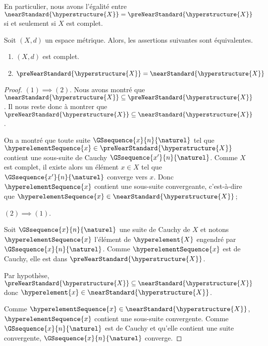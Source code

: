 En particulier, nous avons l'égalité
entre $\nearStandard{\hyperstructure{X}} =
\preNearStandard{\hyperstructure{X}}$ si et seulement si $X$ est complet.

\begin{proposition}
	Soit $(X, d)$ un espace métrique. Alors, les assertions suivantes sont
	équivalentes.

	\begin{enumerate}
		\item $(X, d)$ est complet.
		\item $\preNearStandard{\hyperstructure{X}} =
			\nearStandard{\hyperstructure{X}}$
	\end{enumerate}
\end{proposition}

\ifdefined\outputproof
\begin{proof}
	$(1) \implies (2)$. Nous avons montré que $\nearStandard{\hyperstructure{X}}
	\subseteq \preNearStandard{\hyperstructure{X}}$. Il nous reste donc à
	montrer que $\preNearStandard{\hyperstructure{X}} \subseteq
	\nearStandard{\hyperstructure{X}}$.


	On a montré que toute suite
	$\GSsequence{x}{n}{\naturel}$ tel que $\hyperelementSequence{x} \in
	\preNearStandard{\hyperstructure{X}}$ contient une sous-suite de Cauchy
	$\GSsequence{x'}{n}{\naturel}$. Comme $X$ est complet, il existe
	alors un élément $x \in X$ tel que $\GSsequence{x'}{n}{\naturel}$
	converge vers $x$. Donc $\hyperelementSequence{x}$ contient une sous-suite
	convergeante, c'est-à-dire que $\hyperelementSequence{x} \in
	\nearStandard{\hyperstructure{X}}$;

	$(2) \implies (1)$.

	Soit $\GSsequence{x}{n}{\naturel}$ une suite de Cauchy de $X$ et notons
	$\hyperelementSequence{x}$ l'élément de $\hyperelement{X}$ engendré par
	$\GSsequence{x}{n}{\naturel}$. Comme $\hyperelementSequence{x}$ est de
	Cauchy, elle est dans $\preNearStandard{\hyperstructure{X}}$.

	Par hypothèse,
	$\preNearStandard{\hyperstructure{X}} \subseteq
	\nearStandard{\hyperstructure{X}}$ donc $\hyperelement{x} \in
	\nearStandard{\hyperstructure{X}}$.

	Comme $\hyperelementSequence{x} \in \nearStandard{\hyperstructure{X}}$,
	$\hyperelementSequence{x}$ contient une sous-suite convergente. Comme
	$\GSsequence{x}{n}{\naturel}$ est de Cauchy et qu'elle contient une suite
	convergente, $\GSsequence{x}{n}{\naturel}$ converge.
\end{proof}
\fi

